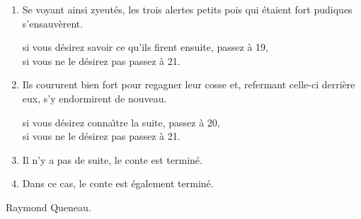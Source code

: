 {\begin{multicols}{2}
\begin{enumerate}
\item Se voyant ainsi zyeut\'es, les trois alertes petits pois qui \'etaient
fort pudiques s'ensauv\`erent.

si vous d\'esirez savoir ce qu'ils firent ensuite, passez \`a 19,\\
si vous ne le d\'esirez pas passez \`a 21.

\item Ils coururent bien fort pour regagner leur cosse et, refermant celle-ci
derri\`ere eux, s'y endormirent de nouveau.

si vous d\'esirez conna\^\i tre la suite, passez \`a 20,\\
si vous ne le d\'esirez pas passez \`a 21.

\item Il n'y a pas de suite, le conte est termin\'e.

\item Dans ce cas, le conte est \'egalement termin\'e.

\end{enumerate} 

\begin{flushright}
Raymond Queneau.
\end{flushright}

\end{multicols}
}%
